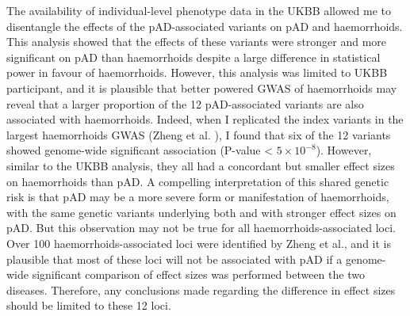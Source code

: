 
The availability of individual-level phenotype data in the UKBB allowed me to disentangle the effects of the pAD-associated variants on pAD and haemorrhoids. This analysis showed that the effects of these variants were stronger and more significant on pAD than haemorrhoids despite a large difference in statistical power in favour of haemorrhoids. However, this analysis was limited to UKBB participant, and it is plausible that better powered GWAS of haemorrhoids may reveal that a larger proportion of the 12 pAD-associated variants are also associated with haemorrhoids. Indeed, when I replicated the index variants in the largest haemorrhoids GWAS (Zheng et al. \cite{Zheng2021-ss}), I found that six of the 12 variants showed genome-wide significant association (P-value < $5\times10^{-8}$). However, similar to the UKBB analysis, they all had a concordant but smaller effect sizes on haemorrhoids than pAD. A compelling interpretation of this shared genetic risk is that pAD may be a more severe form or manifestation of haemorrhoids, with the same genetic variants underlying both and with stronger effect sizes on pAD. But this observation may not be true for all haemorrhoids-associated loci. Over 100 haemorrhoids-associated loci were identified by Zheng et al., and it is plausible that most of these loci will not be associated with pAD if a genome-wide significant comparison of effect sizes was performed between the two diseases. Therefore, any conclusions made regarding the difference in effect sizes should be limited to these 12 loci.\\

